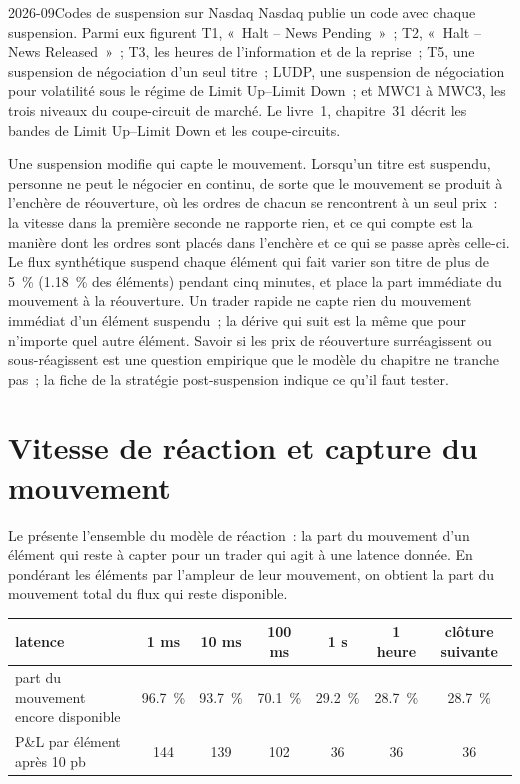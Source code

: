 \begin{dated}{2026-09}{Codes de suspension sur Nasdaq}\label{dat:s1:news-and-events:halts}
Nasdaq publie un code avec chaque suspension. Parmi eux figurent T1, «~Halt -- News Pending~»~; T2, «~Halt -- News Released~»~; T3, les heures de l'information et de la reprise~; T5, une
suspension de négociation d'un seul titre~; LUDP, une suspension de négociation pour volatilité sous le régime de Limit Up--Limit Down~; et MWC1 à MWC3, les trois niveaux du
coupe-circuit de marché. Le livre~1, chapitre~31 décrit les bandes de Limit Up--Limit Down et les coupe-circuits.
\end{dated}

Une suspension modifie qui capte le mouvement. Lorsqu'un titre est suspendu, personne ne peut le négocier en continu, de sorte que le mouvement se produit à l'enchère de réouverture, où
les ordres de chacun se rencontrent à un seul prix~: la vitesse dans la première seconde ne rapporte rien, et ce qui compte est la manière dont les ordres sont placés dans l'enchère et ce qui se passe
après celle-ci. Le flux synthétique suspend chaque élément qui fait varier son titre de plus de 5~\% (1.18~\% des éléments) pendant cinq minutes, et place la part immédiate du mouvement
à la réouverture. Un trader rapide ne capte rien du mouvement immédiat d'un élément suspendu~; la dérive qui suit est la même que pour n'importe quel autre élément.
Savoir si les prix de réouverture surréagissent ou sous-réagissent est une question empirique que le modèle du chapitre ne tranche pas~; la fiche de la
stratégie post-suspension indique ce qu'il faut tester.

\section{Vitesse de réaction et capture du mouvement}

Le  présente l'ensemble du modèle de réaction~: la part du mouvement d'un élément qui reste à capter pour un trader qui agit à une latence donnée.
En pondérant les éléments par l'ampleur de leur mouvement, on obtient la part du mouvement total du flux qui reste disponible.

\begin{center}
\small
\begin{tabular}{@{}lcccccc@{}}
\toprule
latence & 1 ms & 10 ms & 100 ms & 1 s & 1 heure & clôture suivante\\
\midrule
part du mouvement encore disponible & 96.7~\% & 93.7~\% & 70.1~\% & 29.2~\% & 28.7~\% & 28.7~\%\\
P\&L par élément après 10 pb & 144 & 139 & 102 & 36 & 36 & 36\\
\bottomrule
\end{tabular}
\end{center}

